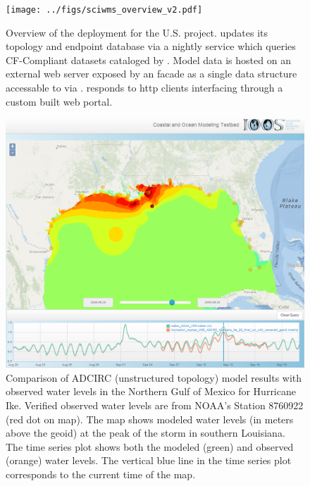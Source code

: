 \begin{figure}[ht!]
  \centering
  \texttt{[image: ../figs/sciwms\_overview\_v2.pdf]}
  \caption{Overview of the \sciwms{} deployment for the U.S. \ioos{}
    \comt{} project. \Sciwms{} updates its topology and endpoint
    database via a nightly service which queries CF-Compliant datasets
    cataloged by \ngdc{}. Model data is hosted on an external web server
    exposed by an \ncml{} facade as a single \netcdf{} data structure
    accessable to \sciwms{} via \opendap{}. \Sciwms{} responds to http
    clients interfacing through a custom built web portal.}
  \label{fig:overview1}
\end{figure}
\begin{figure}[ht!]
  \centering
  \includegraphics[width=0.8\columnwidth]{../figs/SciWMS_ModelObsComparison_crop_373_8_1052_879}
  \caption{Comparison of ADCIRC (unstructured topology) model results
    with observed water levels in the Northern Gulf of Mexico for
    Hurricane Ike. Verified observed water levels are from NOAA's
    Station 8760922 (red dot on map). The map shows modeled water
    levels (in meters above the geoid) at the peak of the storm in
    southern Louisiana. The time series plot shows both the modeled
    (green) and observed (orange) water levels. The vertical blue line
    in the time series plot corresponds to the current time of the
    map.}
  \label{fig:adcirc_comp}
\end{figure}

